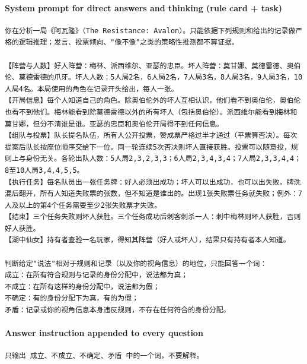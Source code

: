 \paragraph{System prompt for direct answers and thinking (rule card + task)}
\begin{Verbatim}[breaklines,breakanywhere,fontsize=\scriptsize,frame=single,rulecolor=\color{black!25},framesep=4pt]
你在分析一局《阿瓦隆》（The Resistance: Avalon）。只能依据下列规则和给出的记录做严格的逻辑推理；发言、投票倾向、"像不像"之类的策略性推测都不算证据。

【阵营与人数】好人阵营：梅林、派西维尔、亚瑟的忠臣。坏人阵营：莫甘娜、莫德雷德、奥伯伦、莫德雷德的爪牙。坏人人数：5人局2名，6人局2名，7人局3名，8人局3名，9人局3名，10人局4名。本局使用的角色在记录开头给出，每人一张。
【开局信息】每个人知道自己的角色。除奥伯伦外的坏人互相认识，他们看不到奥伯伦，奥伯伦也看不到他们。梅林能看到除莫德雷德以外的所有坏人（包括奥伯伦）。派西维尔能看到梅林和莫甘娜，但分不清谁是谁。亚瑟的忠臣和奥伯伦开局得不到任何信息。
【组队与投票】队长提名队伍，所有人公开投票，赞成票严格过半才通过（平票算否决）。每次提案后队长按座位顺序交给下一位。同一轮连续5次否决则坏人直接获胜。投票可以随意投，规则上与身份无关。各轮出队人数：5人局2,3,2,3,3；6人局2,3,4,3,4；7人局2,3,3,4,4；8至10人局3,4,4,5,5。
【执行任务】每名队员出一张任务牌：好人必须出成功；坏人可以出成功，也可以出失败。牌洗混后翻开，所有人知道失败票的张数，但不知道是谁出的。出现1张失败票任务就失败；例外：7人及以上的第4个任务需要至少2张失败票才失败。
【结束】三个任务失败则坏人获胜。三个任务成功后刺客刺杀一人：刺中梅林则坏人获胜，否则好人获胜。
【湖中仙女】持有者查验一名玩家，得知其阵营（好人或坏人），结果只有持有者本人知道。

判断给定"说法"相对于规则和记录（以及你的视角信息）的地位，只能回答一个词：
成立：在所有符合规则与记录的身份分配中，说法都为真；
不成立：在所有这样的身份分配中，说法都为假；
不确定：有的身份分配下为真，有的为假；
矛盾：记录或你的视角信息本身违反规则，不存在任何符合的身份分配。
\end{Verbatim}

\paragraph{Answer instruction appended to every question}
\begin{Verbatim}[breaklines,breakanywhere,fontsize=\scriptsize,frame=single,rulecolor=\color{black!25},framesep=4pt]
只输出 成立、不成立、不确定、矛盾 中的一个词，不要解释。
\end{Verbatim}

